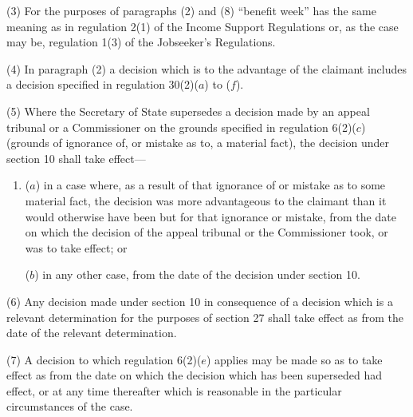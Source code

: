 \documentclass[12pt,a4paper]{article}
\begin{document}
(3) For the purposes of paragraphs (2) and (8) “benefit week” has the same meaning as in regulation 2(1) of the Income Support Regulations or, as the case may be, regulation 1(3) of the Jobseeker’s Regulations.

(4) In paragraph (2) a decision which is to the advantage of the claimant includes a decision specified in regulation 30(2)($a$) to ($f$).

(5) Where the Secretary of State supersedes a decision made by an appeal tribunal or a Commissioner on the grounds specified in regulation 6(2)($c$) (grounds of ignorance of, or mistake as to, a material fact), the decision under section 10 shall take effect—
\begin{enumerate}\item[]
($a$) in a case where, as a result of that ignorance of or mistake as to some material fact, the decision was more advantageous to the claimant than it would otherwise have been but for that ignorance or mistake, from the date on which the decision of the appeal tribunal or the Commissioner took, or was to take effect; or

($b$) in any other case, from the date of the decision under section 10.
\end{enumerate}

(6) Any decision made under section 10 in consequence of a decision which is a relevant determination for the purposes of section 27 shall take effect as from the date of the relevant determination.

(7) A decision to which regulation 6(2)($e$) applies may be made so as to take effect as from the date on which the decision which has been superseded had effect, or at any time thereafter which is reasonable in the particular circumstances of the case.

%
\end{document}
